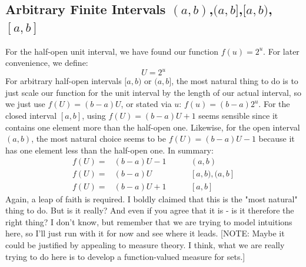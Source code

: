 \documentclass[12pt]{article}
\begin{document}
\subsection{Arbitrary Finite Intervals $(a,b)$,$(a,b]$,$[a,b)$,$[a,b]$}
For the half-open unit interval, we have found our function $f(u) = 2^u$. For later convenience, we define: 
\begin{equation}
	U = 2^u
\end{equation}
For arbitrary half-open intervals $[a,b)$ or $(a,b]$, the most natural thing to do is to just scale our function for the unit interval by the length of our actual interval, so we just use $f(U) = (b-a) U$, or stated via $u$: $f(u) = (b-a) 2^u$. For the closed interval $[a,b]$, using $f(U) = (b-a) U + 1$ seems sensible since it contains one element more than the half-open one. Likewise, for the open interval $(a,b)$, the most natural choice seems to be $f(U) = (b-a) U - 1$ because it has one element less than the half-open one. In summary:
\begin{eqnarray}
 f(U) =& (b-a) U - 1                 & \qquad (a,b) \\
 f(U) =& (b-a) U \quad \; \; \, \,   & \qquad [a,b),(a,b] \\
 f(U) =& (b-a) U + 1                 & \qquad [a,b]
\end{eqnarray}
Again, a leap of faith is required. I boldly claimed that this is the "most natural" thing to do. But is it really? And even if you agree that it is - is it therefore the right thing? I don't know, but remember that we are trying to model intuitions here, so I'll just run with it for now and see where it leads. [NOTE: Maybe it could be justified by appealing to measure theory. I think, what we are really trying to do here is to develop a function-valued measure for sets.]
\end{document}
